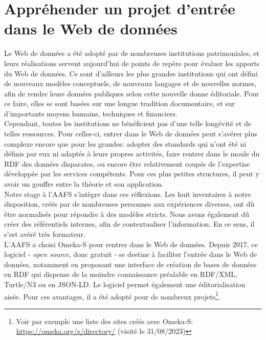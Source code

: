 \documentclass[a4paper,12pt,twoside]{book}
\begin{document}
 
	\part{Appréhender un projet d'entrée dans le Web de données}


Le Web de données a été adopté par de nombreuses institutions patrimoniales, et leurs réalisations servent aujourd'hui de points de repère pour évaluer les apports du Web de données. Ce sont d'ailleurs les plus grandes institutions qui ont défini de nouveaux modèles conceptuels, de nouveaux langages et de nouvelles normes, afin de rendre leurs données publiques selon cette nouvelle donne éditoriale. Pour ce faire, elles se sont basées sur une longue tradition documentaire, et sur d'importants moyens humains, techniques et financiers.\\

Cependant, toutes les institutions ne bénéficient pas d'une telle longévité et de telles ressources. Pour celles-ci, entrer dans le Web de données peut s'avérer plus complexe encore que pour les grandes: adopter des standards qui n'ont été ni définis par eux ni adaptés à leurs propres activités, faire rentrer dans le moule du RDF des données disparates, ou encore être relativement coupés de l'expertise développée par les services compétents. Pour ces plus petites structures, il peut y avoir un gouffre entre la théorie et son application.\\


Notre stage à l'AAFS s'intègre dans ces réflexions. Les huit inventaires à notre disposition, créés par de nombreuses personnes aux expériences diverses, ont dû être normalisés pour répondre à des modèles stricts. Nous avons également dû créer des référentiels internes, afin de contextualiser l'information. En ce sens, il s'est avéré très formateur.\\

L'AAFS a choisi Omeka-S pour rentrer dans le Web de données. Depuis 2017, ce logiciel - \textit{open source}, donc gratuit - se destine à faciliter l'entrée dans le Web de données, notamment en proposant une interface de création de bases de données en RDF qui dispense de la moindre connaissance préalable en RDF/XML, Turtle/N3 ou en JSON-LD. Le logiciel permet également une éditorialisation aisée. Pour ces avantages, il a été adopté pour de nombreux projets\footnote{Voir par exemple une liste des sites créés avec Omeka-S: \url{https://omeka.org/s/directory/} (visité le 31/08/2023)}.\\
\end{document}
